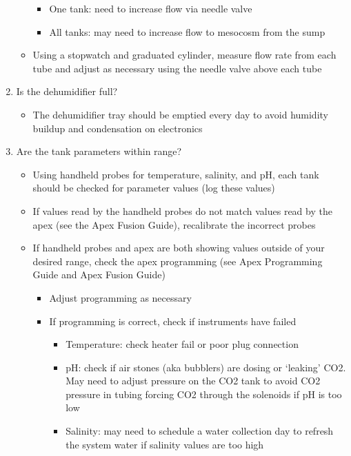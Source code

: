 \documentclass[
]{book}
\providecommand{\tightlist}{%
  \setlength{\itemsep}{0pt}\setlength{\parskip}{0pt}}
\begin{document}
\begin{enumerate}
\begin{itemize}
    \begin{itemize}
    \tightlist
    \item
      One tank: need to increase flow via needle valve
    \item
      All tanks: may need to increase flow to mesocosm from the sump
    \end{itemize}
  \item
    Using a stopwatch and graduated cylinder, measure flow rate from each tube and adjust as necessary using the needle valve above each tube
  \end{itemize}
\item
  Is the dehumidifier full?

  \begin{itemize}
  \tightlist
  \item
    The dehumidifier tray should be emptied every day to avoid humidity buildup and condensation on electronics
  \end{itemize}
\item
  Are the tank parameters within range?

  \begin{itemize}
  \tightlist
  \item
    Using handheld probes for temperature, salinity, and pH, each tank should be checked for parameter values (log these values)
  \item
    If values read by the handheld probes do not match values read by the apex (see the Apex Fusion Guide), recalibrate the incorrect probes
  \item
    If handheld probes and apex are both showing values outside of your desired range, check the apex programming (see Apex Programming Guide and Apex Fusion Guide)

    \begin{itemize}
    \tightlist
    \item
      Adjust programming as necessary
    \item
      If programming is correct, check if instruments have failed

      \begin{itemize}
      \tightlist
      \item
        Temperature: check heater fail or poor plug connection
      \item
        pH: check if air stones (aka bubblers) are dosing or `leaking' CO2. May need to adjust pressure on the CO2 tank to avoid CO2 pressure in tubing forcing CO2 through the solenoids if pH is too low
      \item
        Salinity: may need to schedule a water collection day to refresh the system water if salinity values are too high
      \end{itemize}
    \end{itemize}
  \end{itemize}
\end{enumerate}
\end{document}
